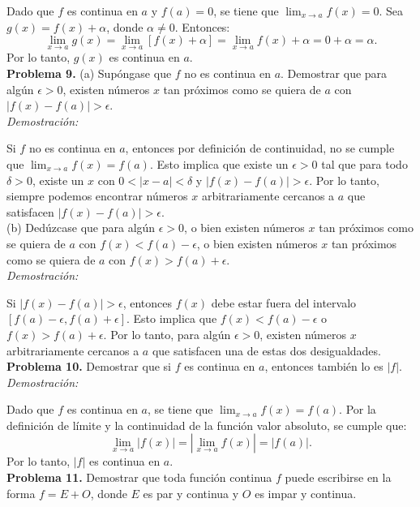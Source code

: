 Dado que $f$ es continua en $a$ y $f(a) = 0$, se tiene que $\lim_{x \to a} f(x) = 0$. Sea $g(x) = f(x) + \alpha$, donde $\alpha \neq 0$. Entonces:
\[
\lim_{x \to a} g(x) = \lim_{x \to a} [f(x) + \alpha] = \lim_{x \to a} f(x) + \alpha = 0 + \alpha = \alpha.
\]
Por lo tanto, $g(x)$ es continua en $a$.\\

\textbf{Problema 9.}
(a) Supóngase que $f$ no es continua en $a$. Demostrar que para algún $\epsilon > 0$, existen números $x$ tan próximos como se quiera de $a$ con $|f(x) - f(a)| > \epsilon$.\\

\textit{Demostración:}

Si $f$ no es continua en $a$, entonces por definición de continuidad, no se cumple que $\lim_{x \to a} f(x) = f(a)$. Esto implica que existe un $\epsilon > 0$ tal que para todo $\delta > 0$, existe un $x$ con $0 < |x - a| < \delta$ y $|f(x) - f(a)| > \epsilon$. Por lo tanto, siempre podemos encontrar números $x$ arbitrariamente cercanos a $a$ que satisfacen $|f(x) - f(a)| > \epsilon$.\\

(b) Dedúzcase que para algún $\epsilon > 0$, o bien existen números $x$ tan próximos como se quiera de $a$ con $f(x) < f(a) - \epsilon$, o bien existen números $x$ tan próximos como se quiera de $a$ con $f(x) > f(a) + \epsilon$.\\

\textit{Demostración:}

Si $|f(x) - f(a)| > \epsilon$, entonces $f(x)$ debe estar fuera del intervalo $[f(a) - \epsilon, f(a) + \epsilon]$. Esto implica que $f(x) < f(a) - \epsilon$ o $f(x) > f(a) + \epsilon$. Por lo tanto, para algún $\epsilon > 0$, existen números $x$ arbitrariamente cercanos a $a$ que satisfacen una de estas dos desigualdades.\\

\textbf{Problema 10.}
Demostrar que si $f$ es continua en $a$, entonces también lo es $|f|$.\\

\textit{Demostración:}

Dado que $f$ es continua en $a$, se tiene que $\lim_{x \to a} f(x) = f(a)$. Por la definición de límite y la continuidad de la función valor absoluto, se cumple que:
\[
\lim_{x \to a} |f(x)| = |\lim_{x \to a} f(x)| = |f(a)|.
\]
Por lo tanto, $|f|$ es continua en $a$.\\

\textbf{Problema 11.}
Demostrar que toda función continua $f$ puede escribirse en la forma $f = E + O$, donde $E$ es par y continua y $O$ es impar y continua.\\

